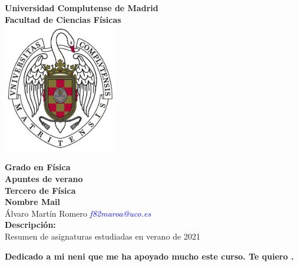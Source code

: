 \begin{titlepage}
    \begin{center}
        \textbf{\LARGE Universidad Complutense de Madrid}\\[0.5cm] 
        \textbf{\large Facultad de Ciencias Físicas}\\[0.2cm]
        \vspace{20pt}\includegraphics[width=5cm]{img/ucm.png}\\
        \par
        \vspace{20pt}
          \textbf{\Large Grado en Física}\\
          \vspace{15pt}
          \myrule[1pt][7pt]
          \textbf{\LARGE  Apuntes de verano}\\
          \vspace{15pt}
          \textbf{\large Tercero de Física}\\
          \myrule[1pt][7pt]
          \vspace{35pt}
          \textbf{\large Nombre \hspace{100pt} Mail}\\
          \vspace{15pt}
          Álvaro Martín Romero \hspace{50pt} \textcolor{blue}{\textit{f82maroa@uco.es}} \\ 


          \vspace{70pt}  
          \textbf {\large Descripción:}\\[0.2cm]
          \Large {Resumen de asignaturas estudiadas en verano de 2021}\\[0.1cm]
      \end{center}

      \par
      \vfill
      \begin{center}
          \textbf{Dedicado a mi neni que me ha apoyado mucho este curso. Te quiero .}\\
      \end{center}

  \end{titlepage}
